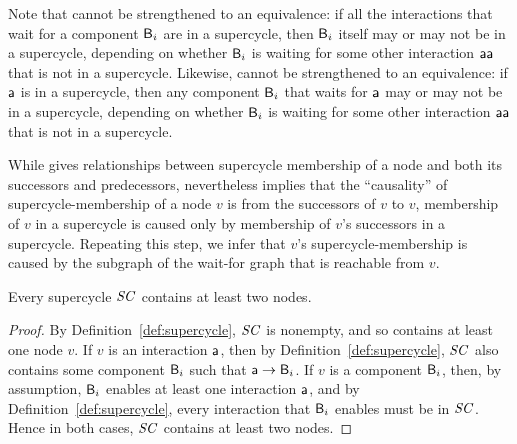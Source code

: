 Note that  cannot be strengthened to an equivalence: if all
the interactions that wait for a component $\mathsf{B}_i$ are in a supercycle, then $\mathsf{B}_i$ itself may or may
not be in a supercycle, depending on whether $\mathsf{B}_i$ is waiting for some other interaction $\mathsf{aa}$ that is not in a
supercycle.
%
Likewise,  cannot be strengthened to an equivalence: if $\mathsf{a}$
is in a supercycle, then any component $\mathsf{B}_i$ that waits for $\mathsf{a}$ may or may not be in a 
supercycle, depending on whether $\mathsf{B}_i$ is waiting for some other interaction $\mathsf{aa}$ that is not in a supercycle. 

While  gives relationships between supercycle membership of a node and both its
successors and predecessors, nevertheless  implies that the ``causality'' of
supercycle-membership of a node $v$ is from the successors of $v$ to $v$, \ie membership of $v$ in a
supercycle is caused only by membership of $v$'s successors in a supercycle. Repeating this step, we
infer that $v$'s supercycle-membership is caused by the subgraph of the wait-for graph that is
reachable from $v$.







\begin{proposition} \label{prop:supercycle:contains-twoNodes}
Every supercycle $\mathit{SC}$ contains at least two nodes.
\end{proposition} 

\begin{proof}
By Definition~\ref{def:supercycle}, $\mathit{SC}$ is nonempty, and so contains at least one node $v$.
If $v$ is an interaction $\mathsf{a}$, then by Definition~\ref{def:supercycle}, $\mathit{SC}$ also contains some component $\mathsf{B}_i$ such that 
$\mathsf{a} \rightarrow \mathsf{B}_i$. 
If $v$ is a  component $\mathsf{B}_i$, then, by assumption, $\mathsf{B}_i$ enables at least one interaction $\mathsf{a}$, and by 
Definition~\ref{def:supercycle}, every interaction that $\mathsf{B}_i$ enables must be in $\mathit{SC}$.
Hence in both cases, $\mathit{SC}$ contains at least two nodes.
\end{proof}





